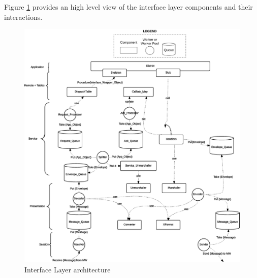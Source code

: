 Figure \ref{fig:impl-il-arch} provides an high level view of
the interface layer components and their interactions.

\begin{figure}[H]
  \centering
  \includegraphics[width=\columnwidth]{images/implementation/il-overall.eps}
  \caption{Interface Layer architecture}
  \label{fig:impl-il-arch}
\end{figure}

